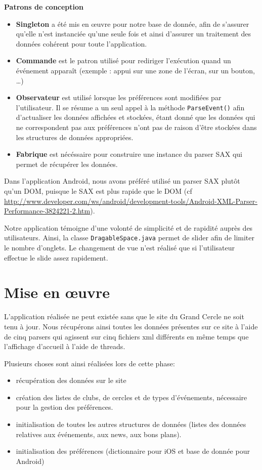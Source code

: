 \documentclass[a4paper, 11px]{article}
\begin{document}
{\bf Patrons de conception}

\begin{itemize}
	\item {\bf Singleton} a été mis en œuvre pour notre base de donnée, afin de s'assurer qu'elle n'est instanciée qu'une seule fois et ainsi d'assurer un traitement des données cohérent pour toute l'application.\\
	\item {\bf Commande} est le patron utilisé pour rediriger l'exécution quand un événement apparaît (exemple : appui sur une zone de l'écran, sur un bouton, \dots)\\
	\item {\bf Observateur} est utilisé lorsque les préférences sont modifiées par l'utilisateur. Il se résume a un seul appel à la méthode \texttt{ParseEvent()} afin d'actualiser les données affichées et stockées, étant donné que les données qui ne correspondent pas aux préférences n'ont pas de raison d'être stockées dans les structures de données appropriées.
	\item {\bf Fabrique} est nécéssaire pour construire une instance du parser SAX qui permet de récupérer les données.
\end{itemize}
Dans l'application Android, nous avons préféré utilisé un parser SAX plutôt qu'un DOM, puisque le SAX est plus rapide que le DOM (cf \href{http://www.developer.com/ws/android/development-tools/Android-XML-Parser-Performance-3824221-2.htm}{http://www.developer.com/ws/android/development-tools/Android-XML-Parser-Performance-3824221-2.htm}).



Notre application témoigne d'une volonté de simplicité et de rapidité auprès des utilisateurs. Ainsi, la classe \texttt{DragableSpace.java} permet de \og slider \fg afin de limiter le nombre d'onglets. Le changement de vue n'est réalisé que si l'utilisateur effectue le slide assez rapidement.

\section{Mise en œuvre}

L'application réalisée ne peut existée sans que le site du Grand Cercle ne soit tenu à jour. Nous récupérons ainsi toutes les données présentes sur ce site à l'aide de cinq parsers qui agissent sur cinq fichiers xml différents en même temps que l'affichage d'accueil à l'aide de threads.

\noindent Plusieurs choses sont ainsi réalisées lors de cette phase:
\begin{itemize}
\item récupération des données sur le site
\item création des listes de clubs, de cercles et de types d'événements, nécessaire pour la gestion des préférences.
\item initialisation de toutes les autres structures de données (listes des données relatives aux événements, aux news, aux bons plans).
\item initialisation des préférences (dictionnaire pour iOS et base de donnée pour Android)
\end{itemize}
\end{document}
